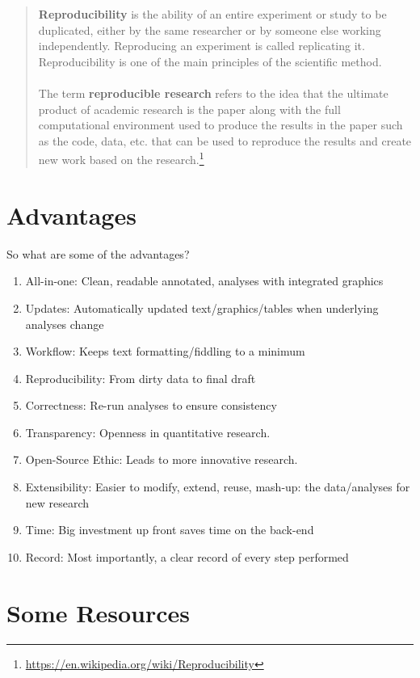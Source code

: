 \documentclass[11pt]{article}
\begin{document}
\begin{quote}
{\bf Reproducibility} is the ability of an entire experiment or study to be duplicated, either by the same researcher or by someone else working independently. Reproducing an experiment is called replicating it. Reproducibility is one of the main principles of the scientific method.\\
\\
The term {\bf reproducible research} refers to the idea that the ultimate product of academic research is the paper along with the full computational environment used to produce the results in the paper such as the code, data, etc. that can be used to reproduce the results and create new work based on the research.\footnote{\url{https://en.wikipedia.org/wiki/Reproducibility}}
\end{quote}

\newpage
\section*{Advantages}

\noindent So what are some of the advantages?

\begin{enumerate}
\item All-in-one: Clean, readable annotated, analyses with integrated graphics
\item Updates: Automatically updated text/graphics/tables when underlying analyses change
\item Workflow: Keeps text formatting/fiddling to a minimum
\item Reproducibility: From dirty data to final draft
\item Correctness: Re-run analyses to ensure consistency
\item Transparency: Openness in quantitative research.
\item Open-Source Ethic: Leads to more innovative research.
\item Extensibility: Easier to modify, extend, reuse, mash-up: the data/analyses for new research
\item Time: Big investment up front saves time on the back-end
\item Record: Most importantly, a clear record of every step performed
\end{enumerate}

\section*{Some Resources}
\end{document}
